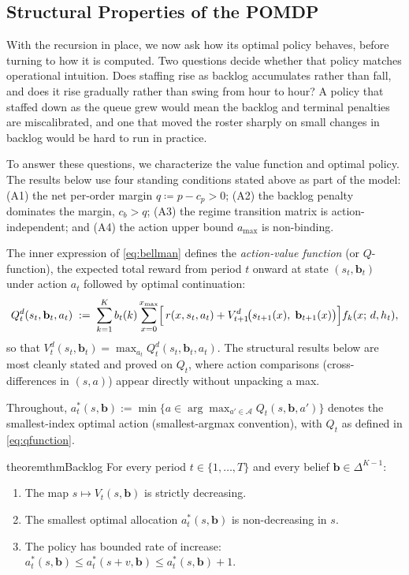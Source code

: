 \documentclass[preprint,11pt,authoryear]{elsarticle}
\newcommand{\bvec}[1]{\mathbf{#1}}
\theoremstyle{remark}
\begin{document}
\subsection{Structural Properties of the POMDP}
\label{sec:structural}

With the recursion in place, we now ask how its optimal policy behaves, before turning to how it is computed. Two questions decide whether that policy matches operational intuition. Does staffing rise as backlog accumulates rather than fall, and does it rise gradually rather than swing from hour to hour? A policy that staffed down as the queue grew would mean the backlog and terminal penalties are miscalibrated, and one that moved the roster sharply on small changes in backlog would be hard to run in practice.

To answer these questions, we characterize the value function and optimal policy. The results below use four standing conditions stated above as part of the model: (A1) the net per-order margin $q \coloneqq p - c_p > 0$; (A2) the backlog penalty dominates the margin, $c_b > q$; (A3) the regime transition matrix is action-independent; and (A4) the action upper bound $a_{\max}$ is non-binding.

The inner expression of \eqref{eq:bellman} defines the \emph{action-value function} (or $Q$-function), the expected total reward from period $t$ onward at state $(s_t, \bvec{b}_t)$ under action $a_t$ followed by optimal continuation:
\begin{equation}
    Q_t^d(s_t, \bvec{b}_t, a_t) \;:=\; \sum_{k=1}^{K} b_t(k)
    \sum_{x=0}^{x_{\max}}
    \Bigl[\, r(x, s_t, a_t) + V_{t+1}^d\!\bigl(s_{t+1}(x),\; \bvec{b}_{t+1}(x)\bigr) \Bigr]
    f_k(x;\, d, h_t),
    \label{eq:qfunction}
\end{equation}
so that $V_t^d(s_t, \bvec{b}_t) = \max_{a_t} Q_t^d(s_t, \bvec{b}_t, a_t)$. The structural results below are most cleanly stated and proved on $Q_t$, where action comparisons (cross-differences in $(s, a)$) appear directly without unpacking a max.

Throughout, $a^*_t(s,\mathbf{b}) := \min\{a \in \arg\max_{a' \in \mathcal{A}} Q_t(s,\mathbf{b},a')\}$ denotes the smallest-index optimal action (smallest-argmax convention), with $Q_t$ as defined in \eqref{eq:qfunction}.

\begin{restatable}{theorem}{thmBacklog}
\label{prop:backlog_monotone}
For every period $t\in\{1,\ldots,T\}$ and every belief $\mathbf{b}\in\Delta^{K-1}$:
\begin{enumerate}[label=(\roman*)]
    \item The map $s\mapsto V_t(s,\mathbf{b})$ is strictly decreasing.
    \item The smallest optimal allocation $a^*_t(s,\mathbf{b})$ is non-decreasing in $s$.
    \item The policy has bounded rate of increase: $a^*_t(s,\mathbf{b}) \leq a^*_t(s+v,\mathbf{b}) \leq a^*_t(s,\mathbf{b}) + 1$.
\end{enumerate}
\end{restatable}
\end{document}
